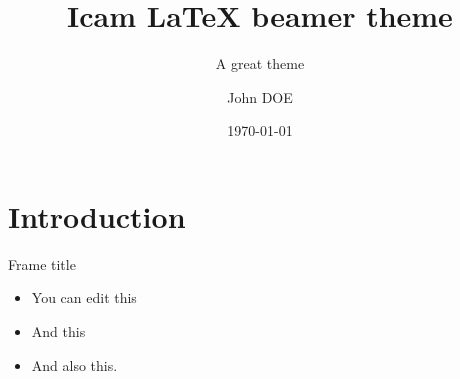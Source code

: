 \documentclass[aspectratio=169]{beamer}
\title{Icam LaTeX beamer theme}
\subtitle{A great theme}
\author{John DOE}
\institute{Icam / Heudiasyc Laboratory}
\date{\today}
\begin{document}
\frame[plain]{\icamtitlepage}

\section{Introduction}

\begin{frame}{Frame title}
  \begin{itemize}
    \item You can edit this
    \item And this
    \item And also this.
  \end{itemize}
\end{frame}





\end{document}
